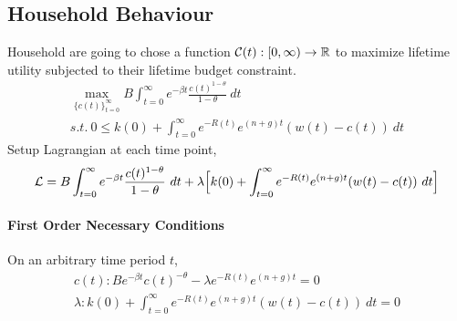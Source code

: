 \documentclass[]{article}
\begin{document}
		\subsection{Household Behaviour}
			\par Household are going to chose a function $\mathcal{{C}}(t): [0, \infty) \to \mathbb{R}$ to maximize lifetime utility subjected to their lifetime budget constraint.
			\begin{gather*}
				\max_{\{c(t)\}_{t=0}^\infty} B \int_{t=0}^\infty e^{-\beta t} \frac{c(t)^{1-\theta}}{1-\theta}\ dt \\
				s.t.\ 0 \leq k(0) + \int_{t=0}^\infty {e^{-R(t)} e^{(n+g)t} (w(t) - c(t))\ dt}
			\end{gather*}
			Setup Lagrangian at each time point,
			\begin{equation}
				\mathcal{{L}} = B \int_{t=0}^\infty e^{-\beta t} \frac{c(t)^{1-\theta}}{1-\theta}\ dt + \lambda \Big [ k(0) + \int_{t=0}^\infty {e^{-R(t)} e^{(n+g)t} (w(t) - c(t))\ dt} \Big ]
			\end{equation}
			\paragraph{First Order Necessary Conditions}
				On an arbitrary time period $t$,
				\begin{gather}
					c(t): B e^{-\beta t} c(t) ^{-\theta} - \lambda e^{-R(t)} e^{(n+g)t} = 0 \\
					\lambda: k(0) + \int_{t=0}^\infty {e^{-R(t)} e^{(n+g)t} (w(t) - c(t))\ dt} = 0
				\end{gather}
\end{document}
